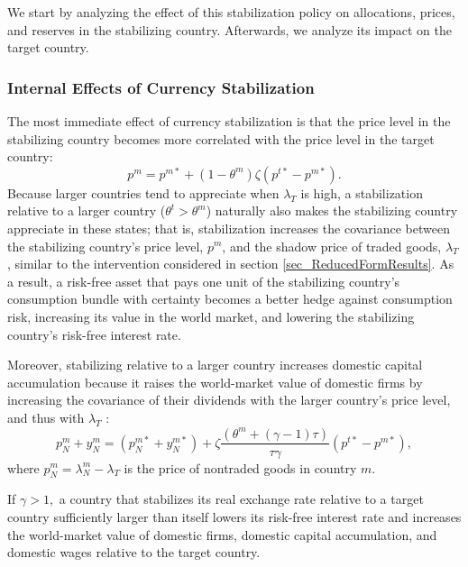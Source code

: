 \documentclass[12pt,letter]{article}
\theoremstyle{break} \theorembodyfont{\normalfont\itshape}
\theoremstyle{break}
\theoremstyle{break} \theorembodyfont{\normalfont\itshape}
\theoremstyle{break} \theorembodyfont{\normalfont\itshape}
\begin{document}
 

We start by analyzing the effect of this stabilization policy on
allocations, prices, and reserves in the stabilizing country.
Afterwards, we analyze its impact on the target country.



\subsubsection{Internal Effects of Currency Stabilization}

 
The most immediate effect of currency stabilization is that the price
level in the stabilizing country becomes more correlated with the
price level in the target country:
\begin{equation*}
  p^m = p^{m \ast} + (1 - \theta^m) \zeta (p^{t \ast} - p^{m \ast}).
\end{equation*}
Because larger countries tend to appreciate when \(\lambda_T\) is
high, a stabilization relative to a larger country
(\(\theta^{t}>\theta^{m}\)) naturally also makes the stabilizing
country appreciate in these states; that is, stabilization increases
the covariance between the stabilizing country's price level,
\(p^{m}\), and the shadow price of traded goods, \(\lambda_T\),
similar to the intervention considered in section
\ref{sec_ReducedFormResults}. As a result, a risk-free asset that pays
one unit of the stabilizing country's consumption bundle with
certainty becomes a better hedge against consumption risk, increasing
its value in the world market, and lowering the stabilizing country's
risk-free interest rate.

Moreover, stabilizing relative to a larger country increases domestic
capital accumulation because it raises the world-market value of
domestic firms by increasing the covariance of their dividends with
the larger country's price level, and thus with \(\lambda_T\) :
\begin{equation}
  p_{N}^m + y_{N}^m
  = \left( p_{N}^{m \ast} + y_{N}^{m \ast} \right)
  + \zeta \frac{\left( \theta^m + (\gamma - 1) \tau \right)}{\tau \gamma}
  \left(p^{t*}- p^{m*} \right), 
  \label{eqn:pN_yN}
\end{equation}
where $p_{N}^m=\lambda^m_N-\lambda_T$ is the price of nontraded goods
in country \(m\).







\begin{prop}
  If \(\gamma>1,\) a country that stabilizes its real exchange rate
  relative to a target country sufficiently larger than itself lowers
  its risk-free interest rate and increases the world-market value of
  domestic firms, domestic capital accumulation, and domestic wages
  relative to the target country.
  \label{prop:KNRBCPeg}
\end{prop}
\end{document}
